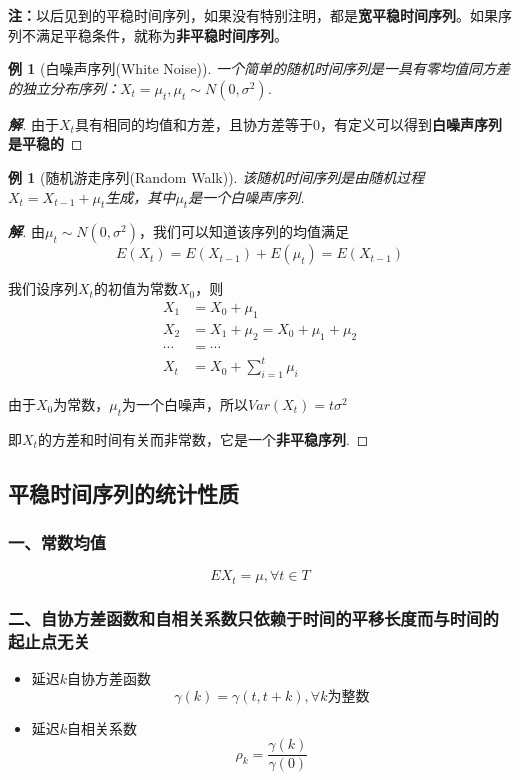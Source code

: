 \documentclass[12pt, a4paper, oneside]{ctexbook}
\newtheorem{example}[theorem]{例}
\newcommand\jie[2]{\begin{proof}[\textbf{#1}]
    #2
\end{proof}}
\begin{document}
\textbf{注：}以后见到的平稳时间序列，如果没有特别注明，都是\textbf{宽平稳时间序列}。如果序列不满足平稳条件，就称为\textbf{非平稳时间序列}。
\begin{example}[白噪声序列(White Noise)]
    一个简单的随机时间序列是一具有零均值同方差的独立分布序列：$X_t=\mu_t,\mu_t\sim N(0,\sigma^2)$.
\end{example}
\jie{解}{由于$X_t$具有相同的均值和方差，且协方差等于0，有定义可以得到\textbf{白噪声序列是平稳的}}

\begin{example}[随机游走序列(Random Walk)]
    该随机时间序列是由随机过程$X_t=X_{t-1}+\mu_t$生成，其中$\mu_t$是一个白噪声序列.
\end{example}
\jie{解}{由$\mu_t \sim N(0,\sigma^2)$，我们可以知道该序列的均值满足
    \begin{equation*}
        E(X_t) = E(X_{t-1}) + E(\mu_t) = E(X_{t-1})
    \end{equation*}
    \par 我们设序列$X_t$的初值为常数$X_0$，则
    \begin{equation*}
        \begin{aligned}
            X_1    & = X_0 + \mu_1                       \\
            X_2    & = X_1 + \mu_2 = X_0 + \mu_1 + \mu_2 \\
            \cdots & = \cdots                            \\
            X_t    & = X_0 + \sum_{i=1}^{t}\mu_i
        \end{aligned}
    \end{equation*}

    由于$X_0$为常数，$\mu_t$为一个白噪声，所以$Var(X_t)=t\sigma^2$

    即$X_t$的方差和时间有关而非常数，它是一个\textbf{非平稳序列}.
}
\subsection{平稳时间序列的统计性质}
\subsubsection{一、常数均值}
\begin{equation}
    EX_t = \mu,\forall t \in T
\end{equation}
\subsubsection{二、自协方差函数和自相关系数只依赖于时间的平移长度而与时间的起止点无关}
\begin{itemize}
    \item 延迟$k$自协方差函数
          \begin{equation}
              \gamma(k)=\gamma(t,t+k),\forall k\text{为整数}
          \end{equation}
    \item 延迟$k$自相关系数
          \begin{equation}\label{eq2.5}
              \rho_k=\frac{\gamma(k)}{\gamma(0)}
          \end{equation}
\end{itemize}
\end{document}
